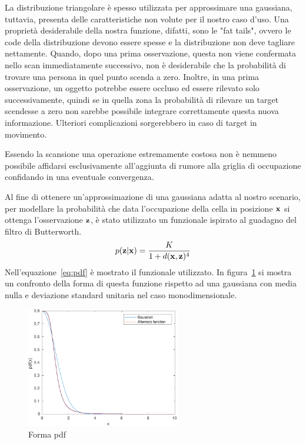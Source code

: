 \documentclass[a4paper]{article}
\begin{document}
	La distribuzione triangolare è spesso utilizzata per approssimare una
	gaussiana, tuttavia, presenta delle caratteristiche non volute per il
	nostro caso d'uso. Una proprietà desiderabile della nostra funzione,
	difatti, sono le "fat tails", ovvero le code della distribuzione devono
	essere spesse e la distribuzione non deve tagliare nettamente. Quando, dopo
	una prima osservazione, questa non viene confermata nello scan
	immediatamente successivo, non è desiderabile che la probabilità di trovare
	una persona in quel punto scenda a zero. Inoltre, in una prima
	osservazione, un oggetto potrebbe essere occluso ed essere rilevato solo
	successivamente, quindi se in quella zona la probabilità di rilevare un
	target scendesse a zero non sarebbe possibile integrare correttamente
	questa nuova informazione.  Ulteriori complicazioni sorgerebbero in caso di
	target in movimento.
	
	Essendo la scansione una operazione estremamente costosa non è nemmeno
	possibile affidarsi esclusivamente all'aggiunta di rumore alla griglia di
	occupazione confidando in una eventuale convergenza.

	Al fine di ottenere un'approssimazione di una gaussiana adatta al
	nostro scenario, per modellare la probabilità che data l'occupazione della
	cella in posizione $ {\bf x} $ si ottenga l'osservazione $ {\bf z} $, è
	stato utilizzato un funzionale ispirato al guadagno del filtro di
	Butterworth.
	\begin{equation}\label{eq:pdf}
		p({\bf z}|{\bf x}) = \frac	{K}
		{1 + d({\bf x},{\bf z})^4 } 
	\end{equation}
	Nell'equazione~\ref{eq:pdf} è mostrato il funzionale utilizzato. In
	figura~\ref{fig:pdf_shape} si mostra un confronto della forma di questa
	funzione rispetto ad una gaussiana con media nulla e deviazione standard
	unitaria nel caso monodimensionale.
	
	\begin{figure}[H]
		\centering
		\includegraphics[width=0.6\textwidth]{./img/pdf_shape.pdf}
		\caption{Forma pdf}
		\label{fig:pdf_shape}
	\end{figure}
\end{document}

